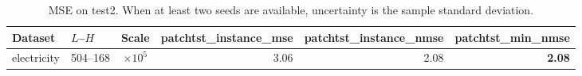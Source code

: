 \begin{table}[htbp]
\centering
\caption{MSE on test2. When at least two seeds are available, uncertainty is the sample standard deviation.}
\begin{tabular}{llcrrr}
\toprule
Dataset & $L$--$H$ & Scale & patchtst\_instance\_mse & patchtst\_instance\_nmse & patchtst\_min\_nmse \\
\midrule
electricity & 504--168 & $\times 10^{5}$ & 3.06 & 2.08 & \textbf{2.08} \\
\bottomrule
\end{tabular}
\end{table}
